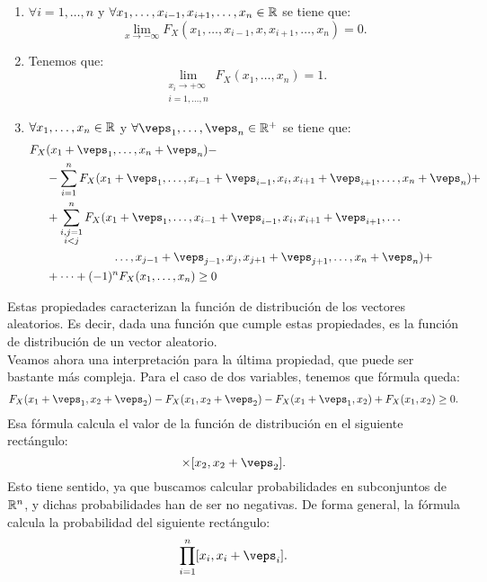 \begin{enumerate}
    \item $\forall i=1, \ldots, n$ y $\forall x_1, \dots, x_{i-1}, x_{i+1}, \dots, x_n \in \mathbb{R}$ se tiene que:
    \begin{equation*}
        \lim_{x\to -\infty} F_X(x_1, \ldots, x_{i-1}, x, x_{i+1}, \ldots, x_n) = 0.
    \end{equation*}

    \item Tenemos que:
    \begin{equation*}
        \lim_{\substack{x_i\to +\infty\\i=1, \ldots, n}} F_X(x_1, \ldots, x_n) = 1.
    \end{equation*}

    \item $\forall x_1, \ldots, x_n \in \mathbb{R}$ y $\forall \veps_1, \ldots, \veps_n\in \bb{R}^+$ se tiene que:
    \begin{align*}
        F_X&(x_1+\veps_1, \ldots, x_n+\veps_n) -\\
        &- \sum_{i=1}^n F_X(x_1 + \veps_1, \ldots, x_{i-1} + \veps_{i-1}, x_i, x_{i+1} + \veps_{i+1}, \ldots, x_n+\veps_n) +\\
        &+ \sum_{\substack{i,j=1\\i<j}}^n F_X(x_1 + \veps_1, \ldots, x_{i-1} + \veps_{i-1}, x_i, x_{i+1} + \veps_{i+1},
        \ldots\\&\hspace{2cm}\ldots, x_{j-1} + \veps_{j-1}, x_j, x_{j+1} + \veps_{j+1}, \ldots, x_n+\veps_n) +\\
        &+\dots+(-1)^n F_X(x_1, \ldots, x_n) \geq 0
    \end{align*}

\end{enumerate}

Estas propiedades caracterizan la función de distribución de los vectores aleatorios. Es decir,
dada una función que cumple estas propiedades, es la función de distribución de un vector aleatorio.\\

Veamos ahora una interpretación para la última propiedad, que puede ser bastante más compleja. Para el caso de dos variables, tenemos que fórmula queda:
\begin{align*}
    F_X(x_1+\veps_1, x_2+\veps_2) - F_X(x_1,x_2+\veps_2) - F_X(x_1+\veps_1,x_2) + F_X(x_1,x_2) \geq 0.
\end{align*}
Esa fórmula calcula el valor de la función de distribución en el siguiente rectángulo:
\begin{equation*}
    [x_1, x_1+\veps_1]\times [x_2, x_2+\veps_2].
\end{equation*}
Esto tiene sentido, ya que buscamos calcular probabilidades en subconjuntos de $\mathbb{R}^n$, y dichas probabilidades han de ser no negativas. De forma general, la fórmula calcula la probabilidad del siguiente rectángulo:
\begin{equation*}
    \prod_{i=1}^n [x_i, x_i+\veps_i].
\end{equation*}

